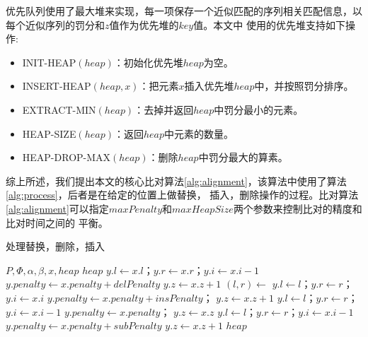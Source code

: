 优先队列使用了最大堆来实现，每一项保存一个近似匹配的序列相关匹配信息，以每个近似序列的罚分和$z$值作为优先堆的$key$值。本文中
使用的优先堆支持如下操作:

\begin{itemize}
    \item INIT-HEAP$(heap)$：初始化优先堆$heap$为空。
    \item INSERT-HEAP$(heap,x)$：把元素$x$插入优先堆$heap$中，并按照罚分排序。
    \item EXTRACT-MIN$(heap)$：去掉并返回$heap$中罚分最小的元素。
    \item HEAP-SIZE$(heap)$：返回$heap$中元素的数量。
    \item HEAP-DROP-MAX$(heap)$：删除$heap$中罚分最大的算素。
\end{itemize}

综上所述，我们提出本文的核心比对算法\ref{alg:alignment}，该算法中使用了算法\ref{alg:process}，后者是在给定的位置上做替换，
插入，删除操作的过程。比对算法\ref{alg:alignment}可以指定$maxPenalty$和$maxHeapSize$两个参数来控制比对的精度和比对时间之间的
平衡。

\begin{algorithm}
    \caption{处理替换，删除，插入}
    \label{alg:process}
    \begin{algorithmic}[1]
        \Require $P,\Phi,\alpha,\beta,x,heap$
        \Ensure $heap$
        \State $y.l\gets x.l$；$y.r\gets x.r$；$y.i\gets x.i-1$  
        \State $y.penalty \gets x.penalty+delPenalty$
        \State $y.z\gets x.z+1$
        \State {}
            \State $(l,r)\gets$
                \State $y.l\gets l$；$y.r\gets r$；$y.i\gets x.i$ 
                \State $y.penalty\gets x.penalty+insPenalty$；
                \State $y.z \gets x.z+1$
                \State {}
                  
                    \State $y.l\gets l$；$y.r\gets r$；$y.i\gets x.i-1$
                    \State $y.penalty\gets x.penalty$；
                    \State $y.z\gets x.z$
                    \State {}
                \Else   {}
                    \State $y.l\gets l$；$y.r\gets r$；$y.i\gets x.i-1$
                    \State $y.penalty\gets x.penalty+subPenalty$
                    \State $y.z\gets x.z+1$
                    \State {}
                \EndIf
            \EndIf
        \EndFor
        \State \Return $heap$
        \EndFunction
   \end{algorithmic}
\end{algorithm}

